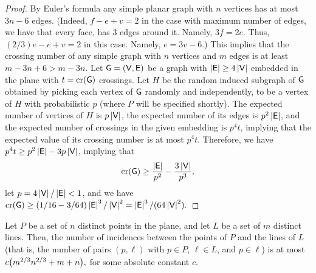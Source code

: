 \begin{proof}
    By Euler's formula any simple planar graph with $n$ vertices has
    at most $3n - 6$ edges. (Indeed, $f-e+v =2$ in the case with
    maximum number of edges, we have that every face, has $3$ edges
    around it. Namely, $3f=2e$.  Thus, $(2/3)e - e + v = 2$ in this
    case. Namely, $e = 3v - 6$.) This implies that the crossing number
    of any simple graph with $n$ vertices and $m$ edges is at least $m
    - 3n + 6 > m -3n$.  Let $\mathsf{G} = (\mathsf{V}, \mathsf{E})$ be a graph
    with $\left| {\mathsf{E}} \right| \geq 4\left| {\mathsf{V}} \right|$ embedded in the plane with
    $t = \mathop{\mathrm{cr}}(\mathsf{G})$ crossings.  Let $H$ be the random induced
    subgraph of $\mathsf{G}$ obtained by picking each vertex of $\mathsf{G}$
    randomly and independently, to be a vertex of $H$ with
    probabilistic $p$ (where $P$ will be specified shortly).  The
    expected number of vertices of $H$ is $p \left| {\mathsf{V}} \right|$, the expected
    number of its edges is $p^2 \left| {\mathsf{E}} \right|$, and the expected
    number of crossings in the given embedding is $p^4 t$, implying
    that the expected value of its crossing number is at most $p^4 t$.
    Therefore, we have $p^4 t \geq p^2 \left| {\mathsf{E}} \right| -3p
    \left| {\mathsf{V}} \right|$, implying that
    \begin{align*}
    \mathop{\mathrm{cr}}(\mathsf{G}) \geq \frac{\left| {\mathsf{E}} \right|}{p^2} - \frac{3\left| {\mathsf{V}} \right|}{p^3},
    \end{align*}
    let $p = 4\left| {\mathsf{V}} \right| / \left| {\mathsf{E}} \right| < 1$, and we have
    \begin{math}
        \CR(\Graph)%
        \geq%
        (1/16 - 3/64)\cardin{\Edges}^3/\cardin{\Vertices}^2%
        =%
        \cardin{\Edges}^3 / (64\cardin{\Vertices}^2 ).
    \end{math}
\end{proof}

\begin{theorem}
    Let $P$ be a set of $n$ distinct points in the plane, and let $L$
    be a set of $m$ distinct lines. Then, the number of incidences
    between the points of $P$ and the lines of $L$ (that is, the
    number of pairs $(p, \ell)$ with $p \in P$, $\ell \in L$, and $p
    \in \ell$) is at most 
    \begin{math}
        \Bigl. c\pth[]{m^{2/3} n^{2/3} + m + n},
    \end{math}
    for some absolute constant $c$.
\end{theorem}

